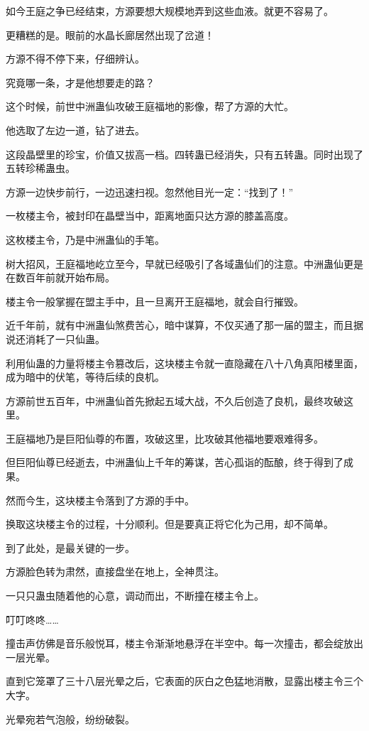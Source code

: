 \begin{this_body}
如今王庭之争已经结束，方源要想大规模地弄到这些血液。就更不容易了。

更糟糕的是。眼前的水晶长廊居然出现了岔道！

方源不得不停下来，仔细辨认。

究竟哪一条，才是他想要走的路？

这个时候，前世中洲蛊仙攻破王庭福地的影像，帮了方源的大忙。

他选取了左边一道，钻了进去。

这段晶壁里的珍宝，价值又拔高一档。四转蛊已经消失，只有五转蛊。同时出现了五转珍稀蛊虫。

方源一边快步前行，一边迅速扫视。忽然他目光一定：“找到了！”

一枚楼主令，被封印在晶壁当中，距离地面只达方源的膝盖高度。

这枚楼主令，乃是中洲蛊仙的手笔。

树大招风，王庭福地屹立至今，早就已经吸引了各域蛊仙们的注意。中洲蛊仙更是在数百年前就开始布局。

楼主令一般掌握在盟主手中，且一旦离开王庭福地，就会自行摧毁。

近千年前，就有中洲蛊仙煞费苦心，暗中谋算，不仅买通了那一届的盟主，而且据说还消耗了一只仙蛊。

利用仙蛊的力量将楼主令篡改后，这块楼主令就一直隐藏在八十八角真阳楼里面，成为暗中的伏笔，等待后续的良机。

方源前世五百年，中洲蛊仙首先掀起五域大战，不久后创造了良机，最终攻破这里。

王庭福地乃是巨阳仙尊的布置，攻破这里，比攻破其他福地要艰难得多。

但巨阳仙尊已经逝去，中洲蛊仙上千年的筹谋，苦心孤诣的酝酿，终于得到了成果。

然而今生，这块楼主令落到了方源的手中。

换取这块楼主令的过程，十分顺利。但是要真正将它化为己用，却不简单。

到了此处，是最关键的一步。

方源脸色转为肃然，直接盘坐在地上，全神贯注。

一只只蛊虫随着他的心意，调动而出，不断撞在楼主令上。

叮叮咚咚……

撞击声仿佛是音乐般悦耳，楼主令渐渐地悬浮在半空中。每一次撞击，都会绽放出一层光晕。

直到它笼罩了三十八层光晕之后，它表面的灰白之色猛地消散，显露出楼主令三个大字。

光晕宛若气泡般，纷纷破裂。


\end{this_body}
